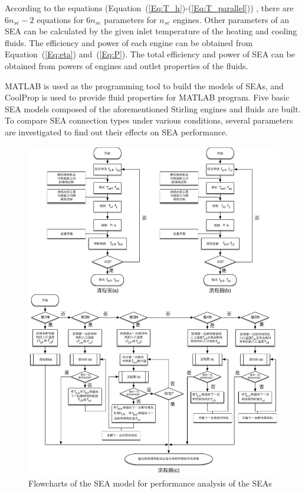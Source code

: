 According to the equations (Equation~(\ref{Eq:T_h})-(\ref{Eq:T_parallel}))
, there are $6n_{se} - 2$ equations for $6n_{se}$ parameters for $n_{se}$ engines. Other parameters of an SEA can be calculated by the given inlet temperature of the heating and cooling fluids. The efficiency and power of each engine can be obtained from Equation~(\ref{Eq:eta}) and~(\ref{Eq:P}). The total efficiency and power of SEA can be obtained from powers of engines and outlet properties of the fluids.

MATLAB is used as the programming tool to build the models of SEAs, and CoolProp is used to provide fluid properties for MATLAB program. Five basic SEA models composed of the aforementioned Stirling engines and fluids are built. To compare SEA connection types under various conditions, several parameters are investigated to find out their effects on SEA performance.

\noindent \begin{figure}[htbp]
\begin{center}
	\includegraphics[width = 1.0\columnwidth]{fig/FlowChart}
	\caption{Flowcharts of the SEA model for performance analysis of the SEAs}
	\label{fig:Flowchart}
\end{center}
\end{figure}

